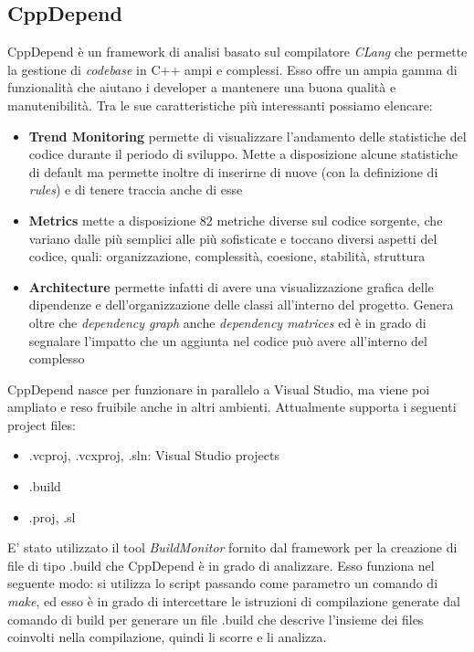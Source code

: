{\subsection{CppDepend}
CppDepend è un framework di analisi basato sul compilatore \textit{CLang} che permette la gestione di \textit{codebase} in C++ ampi e complessi. Esso offre un ampia gamma di funzionalità che aiutano i developer a mantenere una buona qualità e manutenibilità. Tra le sue caratteristiche più interessanti possiamo elencare:
\begin{itemize}
	\item \textbf{Trend Monitoring} permette di visualizzare l'andamento delle statistiche del codice durante il periodo di sviluppo. Mette a disposizione alcune statistiche di default ma permette inoltre di inserirne di nuove (con la definizione di \textit{rules}) e di tenere traccia anche di esse
	\item \textbf{Metrics} mette a disposizione 82 metriche diverse sul codice sorgente, che variano dalle più semplici alle più sofisticate e toccano diversi aspetti del codice, quali: organizzazione, complessità, coesione, stabilità, struttura
	\item \textbf{Architecture} permette infatti di avere una visualizzazione grafica delle dipendenze e dell'organizzazione delle classi all'interno del progetto. Genera oltre che \textit{dependency graph} anche \textit{dependency matrices} ed è in grado di segnalare l'impatto che un aggiunta nel codice può avere all'interno del complesso
\end{itemize}
CppDepend nasce per funzionare in parallelo a Visual Studio, ma viene poi ampliato e reso fruibile anche in altri ambienti. Attualmente supporta i seguenti project files:
\begin{itemize}
\item .vcproj, .vcxproj, .sln: Visual Studio projects
\item .build
\item .proj, .sl
\end{itemize}
E' stato utilizzato il tool \textit{BuildMonitor} fornito dal framework per la creazione di file di tipo .build che CppDepend è in grado di analizzare. Esso funziona nel seguente modo: si utilizza lo script passando come parametro un comando di \textit{make}, ed esso è in grado di intercettare le istruzioni di compilazione generate dal comando di build per generare un file .build che descrive l'insieme dei files coinvolti nella compilazione, quindi li scorre e li analizza.\\ \\
}
